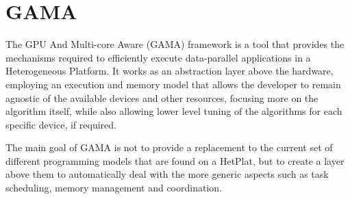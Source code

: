 \section{GAMA}
\label{sec:gama}

The GPU And Multi-core Aware (GAMA) framework is a tool that provides the mechanisms required to efficiently execute data-parallel applications in a Heterogeneous Platform. It works as an abstraction layer above the hardware, employing an execution and memory model that allows the developer to remain agnostic of the available devices and other resources, focusing more on the algorithm itself, while also allowing lower level tuning of the algorithms for each specific device, if required.

The main goal of GAMA is not to provide a replacement to the current set of different programming models that are found on a HetPlat, but to create a layer above them to automatically deal with the more generic aspects such as task scheduling, memory management and coordination.



